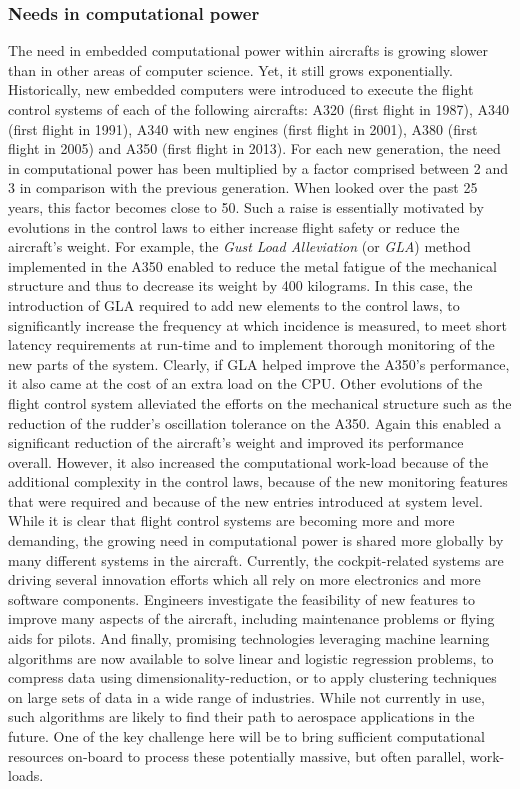 \documentclass[main.tex]{subfiles}
\begin{document}
\subsubsection{Needs in computational power}
The need in embedded computational power within aircrafts is growing slower than in other areas of computer science. Yet, it still grows exponentially. Historically, new embedded computers were introduced to execute the flight control systems of each of the following aircrafts: A320 (first flight in 1987), A340 (first flight in 1991), A340 with new engines (first flight in 2001), A380 (first flight in 2005) and A350 (first flight in 2013). For each new generation, the need in computational power has been multiplied by a factor comprised between 2 and 3 in comparison with the previous generation. When looked over the past 25 years, this factor becomes close to 50. Such a raise is essentially motivated by evolutions in the control laws to either increase flight safety or reduce the aircraft's weight. For example, the \emph{Gust Load Alleviation} (or \emph{GLA}) method implemented in the A350 enabled to reduce the metal fatigue of the mechanical structure and thus to decrease its weight by 400 kilograms. In this case, the introduction of GLA required to add new elements to the control laws, to significantly increase the frequency at which incidence is measured, to meet short latency requirements at run-time and to implement thorough monitoring of the new parts of the system. Clearly, if GLA helped improve the A350's performance, it also came at the cost of an extra load on the CPU. Other evolutions of the flight control system alleviated the efforts on the mechanical structure such as the reduction of the rudder's oscillation tolerance on the A350. Again this enabled a significant reduction of the aircraft's weight and improved its performance overall. However, it also increased the computational work-load because of the additional complexity in the control laws, because of the new monitoring features that were required and because of the new entries introduced at system level.
While it is clear that flight control systems are becoming more and more demanding, the growing need in computational power is shared more globally by many different systems in the aircraft. Currently, the cockpit-related systems are driving several innovation efforts which all rely on more electronics and more software components. Engineers investigate the feasibility of new features to improve many aspects of the aircraft, including maintenance problems or flying aids for pilots.
And finally, promising technologies leveraging machine learning algorithms are now available to solve linear and logistic regression problems, to compress data using dimensionality-reduction, or to apply clustering techniques on large sets of data in a wide range of industries. While not currently in use, such algorithms are likely to find their path to aerospace applications in the future. One of the key challenge here will be to bring sufficient computational resources on-board to process these potentially massive, but often parallel, work-loads.
\end{document}
